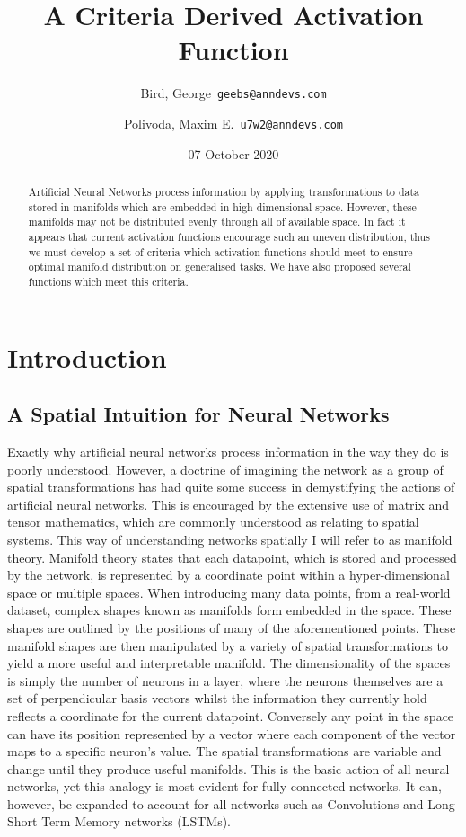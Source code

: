 \documentclass[onecolumn]{article}
\begin{document}
\title{A Criteria Derived Activation Function}

\author{
   Bird, George\
  \texttt{geebs@anndevs.com}
  \and
  Polivoda, Maxim E.\
  \texttt{u7w2@anndevs.com}
}
\date{07 October 2020}


\maketitle

\begin{abstract}
    Artificial Neural Networks process information by applying transformations to data stored in manifolds which are embedded in high dimensional space. However, these manifolds may not be distributed evenly through all of available space. In fact it appears that current activation functions encourage such an uneven distribution, thus we must develop a set of criteria which activation functions should meet to ensure optimal manifold distribution on generalised tasks. We have also proposed several functions which meet this criteria.
\end{abstract}

\section{Introduction}
    \subsection{A Spatial Intuition for Neural Networks}
        
    Exactly why artificial neural networks process information in the way they do is poorly understood. However, a doctrine of imagining the network as a group of spatial transformations has had quite some success in demystifying the actions of artificial neural networks. This is encouraged by the extensive use of matrix and tensor mathematics, which are commonly understood as relating to spatial systems. This way of understanding networks spatially I will refer to as manifold theory. Manifold theory states that each datapoint, which is stored and processed by the network, is represented by a coordinate point within a hyper-dimensional space or multiple spaces. When introducing many data points, from a real-world dataset, complex shapes known as manifolds form embedded in the space. These shapes are outlined by the positions of many of the aforementioned points. These manifold shapes are then manipulated by a variety of spatial transformations to yield a more useful and interpretable manifold. The dimensionality of the spaces is simply the number of neurons in a layer, where the neurons themselves are a set of perpendicular basis vectors whilst the information they currently hold reflects a coordinate for the current datapoint. Conversely any point in the space can have its position represented by a vector where each component of the vector maps to a specific neuron's value. The spatial transformations are variable and change until they produce useful manifolds. This is the basic action of all neural networks, yet this analogy is most evident for fully connected networks. It can, however, be expanded to account for all networks such as Convolutions and Long-Short Term Memory networks (LSTMs).
\end{document}
